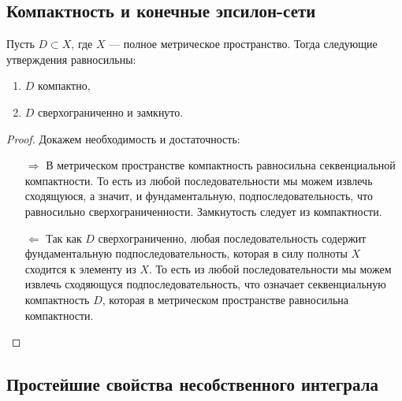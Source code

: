 \subsection{Компактность и конечные эпсилон-сети}

\begin{theorem}
	Пусть \(D \subset X\), где \(X\) --- полное метрическое пространство. Тогда следующие утверждения равносильны:
	\begin{enumerate}
		\item \(D\) компактно,
		\item \(D\) сверхограниченно и замкнуто.
	\end{enumerate}
\end{theorem}

\begin{proof}
	Докажем необходимость и достаточность:
	\begin{enumerate}
		\item[\(\Rightarrow\)] В метрическом пространстве компактность равносильна секвенциальной компактности. То есть из любой последовательности мы можем извлечь сходящуюся, а значит, и фундаментальную, подпоследовательность, что равносильно сверхограниченности. Замкнутость следует из компактности.
		\item[\(\Leftarrow\)] Так как \(D\) сверхограниченно, любая последовательность содержит фундаментальную подпоследовательность, которая в силу полноты \(X\) сходится к элементу из \(X\). То есть из любой последовательности мы можем извлечь сходяющуся подпоследовательность, что означает секвенциальную компактность \(D\), которая в метрическом пространстве равносильна компактности.
	\end{enumerate}
\end{proof}

\subsection{Простейшие свойства несобственного интеграла}

